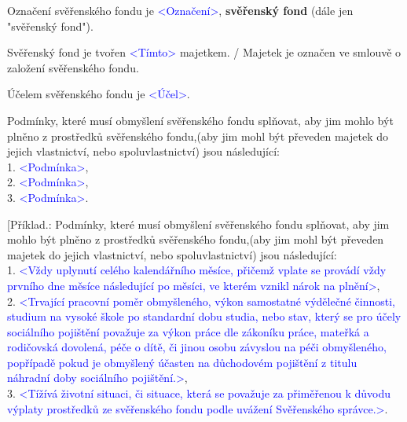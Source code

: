 \documentclass[parskip=half]{scrreprt}
\begin{document}
\begin{contract}


Označení svěřenského fondu je \textcolor{blue}{<Označení>}, \textbf{svěřenský fond} (dále jen "svěřenský fond").


Svěřenský fond je tvořen \textcolor{blue}{<Tímto>} majetkem. / Majetek je označen ve smlouvě o založení svěřenského fondu.


Účelem svěřenského fondu je \textcolor{blue}{<Účel>}.

\parnumbertrue


Podmínky, které musí obmyšlení svěřenského fondu splňovat, aby jim mohlo být plněno z prostředků svěřenského fondu,(aby jim mohl být převeden majetek do jejich vlastnictví, nebo spoluvlastnictví) jsou následující:\\
1. \textcolor{blue}{<Podmínka>},\\
2. \textcolor{blue}{<Podmínka>},\\
3. \textcolor{blue}{<Podmínka>}.

\parnumberfalse
[Příklad.: 
Podmínky, které musí obmyšlení svěřenského fondu splňovat, aby jim mohlo být plněno z prostředků svěřenského fondu,(aby jim mohl být převeden majetek do jejich vlastnictví, nebo spoluvlastnictví) jsou následující:\\
1. \textcolor{blue}{<Vždy uplynutí celého kalendářního měsíce, přičemž vplate se provádí vždy prvního dne měsíce následující po měsíci, ve kterém vznikl nárok na plnění>},\\
2. \textcolor{blue}{<Trvající pracovní poměr obmyšleného, výkon samostatné výdělečné činnosti, studium na vysoké škole po standardní dobu studia, nebo stav, který se pro účely sociálního pojištění považuje za výkon práce dle zákoníku práce, mateřká a rodičovská dovolená, péče o dítě, či jinou osobu závyslou na péči obmyšleného, popřípadě pokud je obmyšlený účasten na důchodovém pojištění z titulu náhradní doby sociálního pojištění.>},\\
3. \textcolor{blue}{<Tížívá životní situaci, či situace, která se považuje za přiměřenou k důvodu výplaty prostředků ze svěřenského fondu podle uvážení Svěřenského správce.>}.\\


\end{contract}
\end{document}
